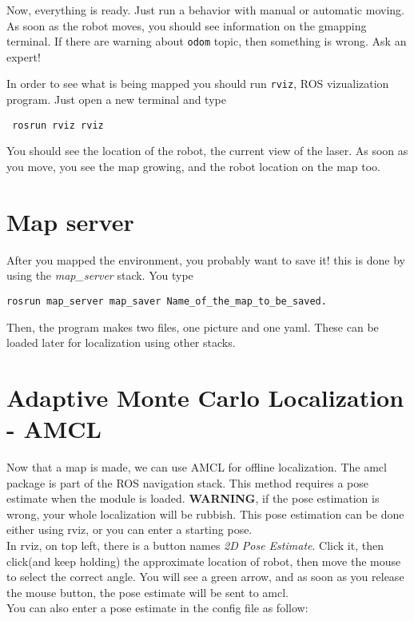 \documentclass[a4paper, 12pt, oneside]{report}
\begin{document}
Now, everything is ready. Just run a behavior with manual or automatic moving. As soon as the robot moves, you should see information on the gmapping
terminal. If there are warning about \verb|odom| topic, then something is wrong. Ask an expert!

In order to see what is being mapped you should run \verb|rviz|, ROS vizualization program. Just open a new terminal and type
\begin{verbatim}
 rosrun rviz rviz
\end{verbatim}

You should see the location of the robot, the current view of the laser. As soon as you move, you see the map growing, and the robot location on the 
map too.

\section{Map server}
After you mapped the environment, you probably want to save it! this is done by using the \textit{map\_server} stack.
You type 

\begin{verbatim}
rosrun map_server map_saver Name_of_the_map_to_be_saved.       
\end{verbatim}

Then, the program makes two files, one picture and one yaml. These can be loaded later for localization using other stacks.

\section{Adaptive Monte Carlo Localization - AMCL}

Now that a map is made, we can use AMCL for offline localization. The amcl package is part of the ROS navigation stack.
This method requires a pose estimate when the module is loaded. \textbf{WARNING}, if the pose estimation is wrong, your whole localization will be rubbish.
This pose estimation can be done either using rviz, or you can enter a starting pose.\\
In rviz, on top left, there is a button names \textit{2D Pose Estimate}. Click it, then click(and keep holding) the approximate location of robot, then move the mouse
to select the correct angle. You will see a green arrow, and as soon as you release the mouse button, the pose estimate will be sent to amcl.\\
You can also enter a pose estimate in the config file as follow:
\end{document}
